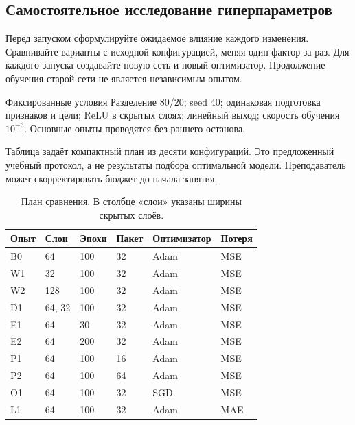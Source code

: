 \subsection{Самостоятельное исследование гиперпараметров}
Перед запуском сформулируйте ожидаемое влияние каждого изменения.
Сравнивайте варианты с исходной конфигурацией, меняя один фактор за раз.
Для каждого запуска создавайте новую сеть и новый оптимизатор.
Продолжение обучения старой сети не является независимым опытом.

\begin{keybox}{Фиксированные условия}
Разделение 80/20; seed 40; одинаковая подготовка признаков и цели;
ReLU в скрытых слоях; линейный выход; скорость обучения \(10^{-3}\).
Основные опыты проводятся без раннего останова.
\end{keybox}

Таблица задаёт компактный план из десяти конфигураций. Это предложенный
учебный протокол, а не результаты подбора оптимальной модели.
Преподаватель может скорректировать бюджет до начала занятия.

\begin{table}[H]
\centering\small
\caption{План сравнения. В столбце «слои» указаны ширины скрытых слоёв.}
\begin{tabular}{@{}llllll@{}}
\toprule
Опыт & Слои & Эпохи & Пакет & Оптимизатор & Потеря \\
\midrule
B0 & 64 & 100 & 32 & Adam & MSE \\
W1 & 32 & 100 & 32 & Adam & MSE \\
W2 & 128 & 100 & 32 & Adam & MSE \\
D1 & 64, 32 & 100 & 32 & Adam & MSE \\
E1 & 64 & 30 & 32 & Adam & MSE \\
E2 & 64 & 200 & 32 & Adam & MSE \\
P1 & 64 & 100 & 16 & Adam & MSE \\
P2 & 64 & 100 & 64 & Adam & MSE \\
O1 & 64 & 100 & 32 & SGD & MSE \\
L1 & 64 & 100 & 32 & Adam & MAE \\
\bottomrule
\end{tabular}
\end{table}

